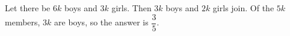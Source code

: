 Let there be $6k$ boys and $3k$ girls. Then $3k$ boys and $2k$ girls join. Of the $5k$ members, $3k$ are boys, so the answer is $\boxed{\dfrac{3}{5}}$.
